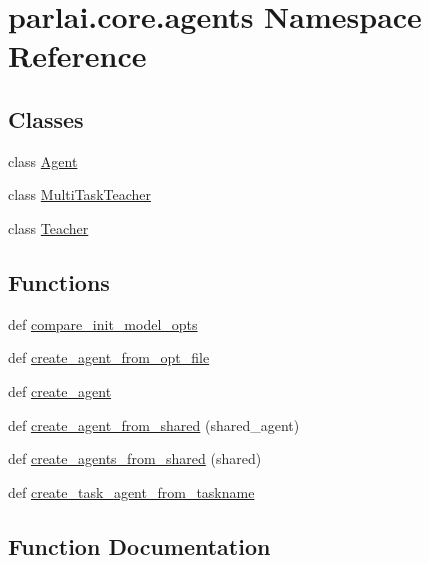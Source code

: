 \hypertarget{namespaceparlai_1_1core_1_1agents}{}\section{parlai.\+core.\+agents Namespace Reference}
\label{namespaceparlai_1_1core_1_1agents}
\subsection*{Classes}
\begin{DoxyCompactItemize}
\item 
class \hyperlink{classparlai_1_1core_1_1agents_1_1Agent}{Agent}
\item 
class \hyperlink{classparlai_1_1core_1_1agents_1_1MultiTaskTeacher}{Multi\+Task\+Teacher}
\item 
class \hyperlink{classparlai_1_1core_1_1agents_1_1Teacher}{Teacher}
\end{DoxyCompactItemize}
\subsection*{Functions}
\begin{DoxyCompactItemize}
\item 
def \hyperlink{namespaceparlai_1_1core_1_1agents_a9761bb2314603dd92f5eee786930b21a}{compare\+\_\+init\+\_\+model\+\_\+opts}
\item 
def \hyperlink{namespaceparlai_1_1core_1_1agents_a8dcf9aa8caf8fe1046ff4cac7f38b54c}{create\+\_\+agent\+\_\+from\+\_\+opt\+\_\+file}
\item 
def \hyperlink{namespaceparlai_1_1core_1_1agents_a00d77a7e26fb89e8bd900f7b2a02982a}{create\+\_\+agent}
\item 
def \hyperlink{namespaceparlai_1_1core_1_1agents_aa5af5dd1d2f9da491b60348d479b849f}{create\+\_\+agent\+\_\+from\+\_\+shared} (shared\+\_\+agent)
\item 
def \hyperlink{namespaceparlai_1_1core_1_1agents_a5600530545f5e60a79e2d657b5af1d8c}{create\+\_\+agents\+\_\+from\+\_\+shared} (shared)
\item 
def \hyperlink{namespaceparlai_1_1core_1_1agents_a76269fb567532a8fb7f29edcc20a6e47}{create\+\_\+task\+\_\+agent\+\_\+from\+\_\+taskname}
\end{DoxyCompactItemize}


\subsection{Function Documentation}
\mbox{\label{namespaceparlai_1_1core_1_1agents_a9761bb2314603dd92f5eee786930b21a}} 
